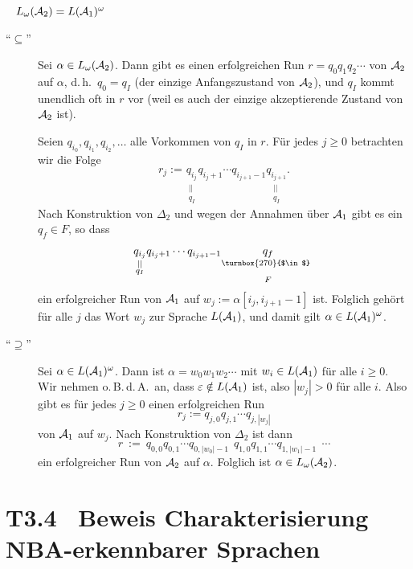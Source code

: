 \documentclass[fontsize=11pt, twoside=false, numbers=autoenddot]{scrbook}
\begin{document}
~ $L_\omega(\mathcal{A}_2) = L(\mathcal{A}_1)^\omega$
%
\begin{description}
  \item[{\boldmath"`$\subseteq$"'}]
    Sei $\alpha \in L_\omega(\mathcal{A}_2)$.
    Dann gibt es einen erfolgreichen Run $r = q_0q_1q_2\cdots$ von $\mathcal{A}_2$
    auf $\alpha$, d.\,h.\ $q_0 = q_I$ (der einzige Anfangszustand von $\mathcal{A}_2$),
    und $q_I$ kommt unendlich oft in $r$ vor (weil es auch der einzige akzeptierende Zustand von $\mathcal{A}_2$ ist).
    
    Seien $q_{i_0},q_{i_1},q_{i_2},\dots$ alle Vorkommen von $q_I$ in $r$.
    Für jedes $j \geq 0$ betrachten wir die Folge
    \[
        r_j := \underset{\substack{||\\q_I}}{q_{i_j}}
               q_{i_j+1}\cdots q_{i_{j+1}-1}
               \underset{\substack{||\\q_I}}{q_{i_{j+1}}}.
    \]
    Nach Konstruktion von $\Delta_2$ und wegen der Annahmen über $\mathcal{A}_1$
    gibt es ein $q_f \in F$, so dass
    \[
        \underset{\substack{||\\q_I}}{q_{i_j}}
        q_{i_j+1}\cdots q_{i_{j+1}-1}
        \underset{\substack{\turnbox{270}{$\in$}\,\,\,\\[7pt]F}}{q_f}
    \]
    ein erfolgreicher Run von $\mathcal{A}_1$ auf
    $w_j := \alpha[i_j,i_{j+1}-1]$
    ist.
    Folglich gehört für alle $j$ das Wort $w_j$ zur Sprache $L(\mathcal{A}_1)$,
    und damit gilt $\alpha \in L(\mathcal{A}_1)^\omega$.
  \item[{\boldmath"`$\supseteq$"'}]
    Sei $\alpha \in L(\mathcal{A}_1)^\omega$.
    Dann ist $\alpha = w_0w_1w_2\cdots$ mit $w_i \in L(\mathcal{A}_1)$ für alle $i \geq 0$.
    Wir nehmen o.\,B.\,d.\,A.\ an, dass $\varepsilon \notin L(\mathcal{A}_1)$ ist,
    also $|w_j| > 0$ für alle $i$.
    Also gibt es für jedes $j \geq 0$ einen erfolgreichen Run
    \[
      r_j := q_{j,0}q_{j,1}\cdots q_{j,|w_j|}
    \]
    von $\mathcal{A}_1$ auf $w_j$.
    Nach Konstruktion von $\Delta_2$ ist dann
    \[
      r ~:=~ q_{0,0}q_{0,1}\cdots q_{0,|w_0|-1}~~
             q_{1,0}q_{1,1}\cdots q_{1,|w_1|-1}~~
             \cdots
    \]
    ein erfolgreicher Run von $\mathcal{A}_2$ auf $\alpha$.
    Folglich ist $\alpha \in L_\omega(\mathcal{A}_2)$.
    \qedhere
\end{description}

\section*{T3.4~ Beweis Charakterisierung NBA-erkennbarer Sprachen}
\end{document}
